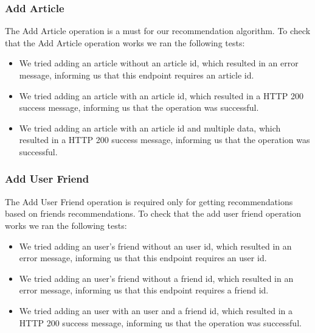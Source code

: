 \subsubsection{Add Article}
\label{sec:basic-operations-add-user}
The Add Article operation is a must for our recommendation algorithm. To check that the Add Article operation works we ran the following tests: 
\begin{itemize}
	\item We tried adding an article without an article id, which resulted in an error message, informing us that this endpoint requires an article id.
	\item We tried adding an article with an article id, which resulted in a HTTP 200 success message, informing us that the operation was successful.
	\item We tried adding an article with an article id and multiple data, which resulted in a HTTP 200 success message, informing us that the operation was successful.
\end{itemize}

\subsubsection{Add User Friend}
\label{sec:basic-operations-add-user}
The Add User Friend operation is required only for getting recommendations based on friends recommendations. To check that the add user friend operation works we ran the following tests: 
\begin{itemize}
	\item We tried adding an user's friend without an user id, which resulted in an error message, informing us that this endpoint requires an user id.
	\item We tried adding an user's friend without a friend id, which resulted in an error message, informing us that this endpoint requires a friend id.
	\item We tried adding an user with an user and a friend id, which resulted in a HTTP 200 success message, informing us that the operation was successful.
\end{itemize}

